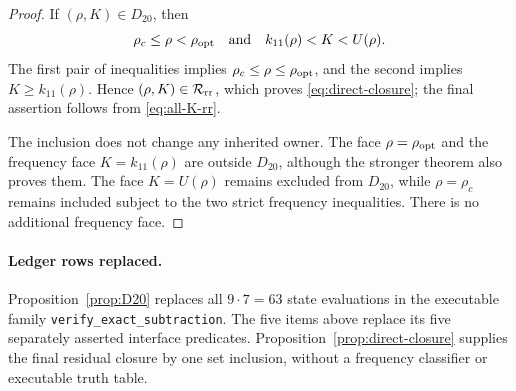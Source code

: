 \documentclass[11pt]{article}
\begin{document}
\begin{proof}
If \((\rho,K)\in D_{20}\), then
\[
 \rho_c\leq\rho<\rho_{\rm opt}
 \quad\text{and}\quad
 k_{11}(\rho)<K<U(\rho).
\]
The first pair of inequalities implies
\(\rho_c\leq\rho\leq\rho_{\rm opt}\), and the second implies
\(K\geq k_{11}(\rho)\).  Hence \((\rho,K)\in\mathcal R_{\rm rr}\),
which proves \eqref{eq:direct-closure}; the final assertion follows from
\eqref{eq:all-K-rr}.

The inclusion does not change any inherited owner.  The face
\(\rho=\rho_{\rm opt}\) and the frequency face
\(K=k_{11}(\rho)\) are outside \(D_{20}\), although the stronger theorem
also proves them.  The face \(K=U(\rho)\) remains excluded from
\(D_{20}\), while \(\rho=\rho_c\) remains included subject to the two
strict frequency inequalities.  There is no additional frequency face.
\end{proof}

\paragraph{Ledger rows replaced.}
Proposition~\ref{prop:D20} replaces all \(9\cdot7=63\) state evaluations
in the executable family \texttt{verify\_exact\_subtraction}. The five
items above replace its five separately asserted interface predicates.
Proposition~\ref{prop:direct-closure} supplies the final residual closure
by one set inclusion, without a frequency classifier or executable truth
table.
\end{document}
